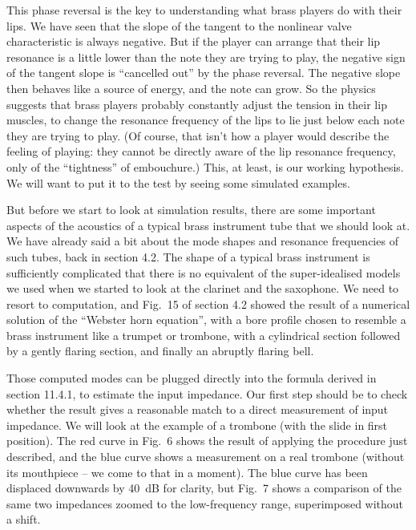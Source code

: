   This phase reversal is the key to understanding what brass players do with 
  their lips. We have seen that the slope of the tangent to the nonlinear valve 
  characteristic is always negative. But if the player can arrange that their 
  lip resonance is a little lower than the note they are trying to play, the 
  negative sign of the tangent slope is “cancelled out” by the phase reversal. 
  The negative slope then behaves like a source of energy, and the note can 
  grow. So the physics suggests that brass players probably constantly adjust 
  the tension in their lip muscles, to change the resonance frequency of the 
  lips to lie just below each note they are trying to play. (Of course, that 
  isn't how a player would describe the feeling of playing: they cannot be 
  directly aware of the lip resonance frequency, only of the ``tightness'' of 
  embouchure.) This, at least, is our working hypothesis. We will want to put 
  it to the test by seeing some simulated examples. 


  But before we start to look at simulation results, there are some important 
  aspects of the acoustics of a typical brass instrument tube that we should 
  look at. We have already said a bit about the mode shapes and resonance 
  frequencies of such tubes, back in section 4.2. The shape of a typical brass 
  instrument is sufficiently complicated that there is no equivalent of the 
  super-idealised models we used when we started to look at the clarinet and 
  the saxophone. We need to resort to computation, and Fig.\ 15 of section 4.2 
  showed the result of a numerical solution of the “Webster horn equation”, 
  with a bore profile chosen to resemble a brass instrument like a trumpet or 
  trombone, with a cylindrical section followed by a gently flaring section, 
  and finally an abruptly flaring bell. 

  Those computed modes can be plugged directly into the formula derived in 
  section 11.4.1, to estimate the input impedance. Our first step should be to 
  check whether the result gives a reasonable match to a direct measurement of 
  input impedance. We will look at the example of a trombone (with the slide in 
  first position). The red curve in Fig.\ 6 shows the result of applying the 
  procedure just described, and the blue curve shows a measurement on a real 
  trombone (without its mouthpiece -- we come to that in a moment). The blue 
  curve has been displaced downwards by 40~dB for clarity, but Fig.\ 7 shows a 
  comparison of the same two impedances zoomed to the low-frequency range, 
  superimposed without a shift. 

